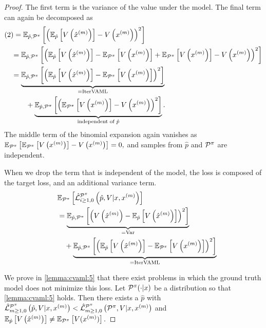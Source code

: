 \begin{proof}
The first term is the variance of the value under the model. 
The final term can again be decomposed as
\begin{align}
   &(2) = \EEX{\hat{p},\P^\pi}{\left(\EEX{\hat{p}}{V\left(\hat{x}^{(m)}\right)} - V\left(x^{(m)}\right)\right)^2} \\
   &\quad=\EEX{\hat{p},\P^\pi}{\left(\EEX{\hat{p}}{V\left(\hat{x}^{(m)}\right)} - \EEX{\P^\pi}{V\left(x^{(m)}\right)} + \EEX{\P^\pi}{V\left(x^{(m)}\right)} - V\left(x^{(m)}\right)\right)^2} \\
   &\quad=\underbrace{\EEX{\hat{p},\P^\pi}{\left(\EEX{\hat{p}}{V\left(\hat{x}^{(m)}\right)} - \EEX{\P^\pi}{V\left(x^{(m)}\right)}\right)^2}}_{= \mathrm{IterVAML}}\nonumber\\
   &\quad \quad\quad + \underbrace{\EEX{\hat{p},\P^\pi}{\left(\EEX{\P^\pi}{V\left(x^{(m)}\right)} - V\left(x^{(m)}\right)\right)^2}}_{\text{independent of }\hat{p}}.
\end{align}
The middle term of the binomial expansion again vanishes as $\EEX{\P^\pi}{\EEX{\P^\pi}{V\left(x^{(m)}\right)} - V\left(x^{(m)}\right)} \allowbreak = 0,$ and samples from $\hat{p}$ and $\P^\pi$ are independent.

When we drop the term that is independent of the model, the loss is composed of the target loss, and an additional variance term.
\begin{align}
   & \EEX{\P^\pi}{\hat{\mathcal{L}}^{\P^\pi}_{i\geq1,0}\left(\hat{p},V|x,x^{(m)}\right)} \\
   \quad & =  \underbrace{\EEX{\hat{p},\P^\pi}{\left(V\left(\hat{x}^{(m)}\right) - \EEX{\hat{p}}{V\left(\hat{x}^{(m)}\right)}\right)^2}}_{= \mathrm{Var}} \nonumber \\
   \quad & \quad +\underbrace{\EEX{\hat{p},\P^\pi}{\left(\EEX{\hat{p}}{V\left(\hat{x}^{(m)}\right)} - \EEX{\P^\pi}{V\left(x^{(m)}\right)}\right)^2}}_{= \mathrm{IterVAML}} \label{eq:final_itervaml_error}
\end{align}

We prove in \autoref{lemma:cvaml:5} that there exist problems in which the ground truth model does not minimize this loss.
Let $\P^\pi(\cdot|x)$ be a distribution so that \autoref{lemma:cvaml:5} holds. 
Then there exists a $\hat{p}$ with \\$\hat{\mathcal{L}}^{\P^\pi}_{m\geq1,0}\left(\hat{p},V|x,x^{(m)}\right) < \hat{\mathcal{L}}^{\P^\pi}_{m\geq1,0}\left(\P^\pi,V|x,x^{(m)}\right)$ and $\EEX{\hat{p}}{V\left(\hat{x}^{(m)}\right)} \neq \EEX{\P^\pi}{V(x^{(m)})}.$
\end{proof}

